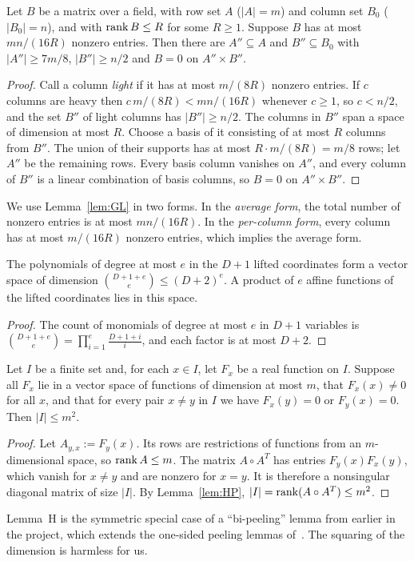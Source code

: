 \begin{lemma}
\label{lem:GL}
Let $B$ be a matrix over a field, with row set $A$ ($|A|=m$) and column set $B_0$ ($|B_0|=n$), and with
$\operatorname{rank} B\le R$ for some $R\ge 1$. Suppose $B$ has at most $mn/(16R)$ nonzero entries. Then there are
$A''\subseteq A$ and $B''\subseteq B_0$ with $|A''|\ge 7m/8$, $|B''|\ge n/2$ and $B=0$ on $A''\times B''$.
\end{lemma}
\begin{proof}
Call a column \emph{light} if it has at most $m/(8R)$ nonzero entries. If $c$ columns are heavy then
$c\,m/(8R)<mn/(16R)$ whenever $c\ge1$, so $c<n/2$, and the set $B''$ of light columns has $|B''|\ge n/2$.
The columns in $B''$ span a space of dimension at most $R$. Choose a basis of it consisting of at most $R$
columns from $B''$. The union of their supports has at most $R\cdot m/(8R)=m/8$ rows; let $A''$ be the
remaining rows. Every basis column vanishes on $A''$, and every column of $B''$ is a linear combination of basis
columns, so $B=0$ on $A''\times B''$.
\end{proof}

We use Lemma~\ref{lem:GL} in two forms. In the \emph{average form}, the total number of nonzero entries is at most
$mn/(16R)$. In the \emph{per-column form}, every column has at most $m/(16R)$ nonzero entries, which implies the
average form.

\begin{lemma}\label{lem:DIM}
The polynomials of degree at most $e$ in the $D+1$ lifted coordinates form a vector space of dimension
$\binom{D+1+e}{e}\le(D+2)^e$. A product of $e$ affine functions of the lifted coordinates lies in this space.
\end{lemma}
\begin{proof}
The count of monomials of degree at most $e$ in $D+1$ variables is $\binom{D+1+e}{e}=\prod_{i=1}^e\frac{D+1+i}{i}$,
and each factor is at most $D+2$.
\end{proof}

\begin{lemma}\label{lem:H}
Let $I$ be a finite set and, for each $x\in I$, let $F_x$ be a real function on $I$. Suppose all $F_x$ lie in a
vector space of functions of dimension at most $m$, that $F_x(x)\ne0$ for all $x$, and that for every pair
$x\ne y$ in $I$ we have $F_x(y)=0$ or $F_y(x)=0$. Then $|I|\le m^2$.
\end{lemma}
\begin{proof}
Let $A_{y,x}:=F_y(x)$. Its rows are restrictions of functions from an $m$-dimensional space, so $\operatorname{rank} A\le m$. The
matrix $A\circ A^{T}$ has entries $F_y(x)F_x(y)$, which vanish for $x\ne y$ and are nonzero for $x=y$. It is
therefore a nonsingular diagonal matrix of size $|I|$. By Lemma~\ref{lem:HP}, $|I|=\operatorname{rank}(A\circ A^{T})\le m^2$.
\end{proof}
Lemma~H is the symmetric special case of a ``bi-peeling'' lemma from earlier in the project, which extends the
one-sided peeling lemmas of~\cite{Peer}. The squaring of the dimension is harmless for us.


